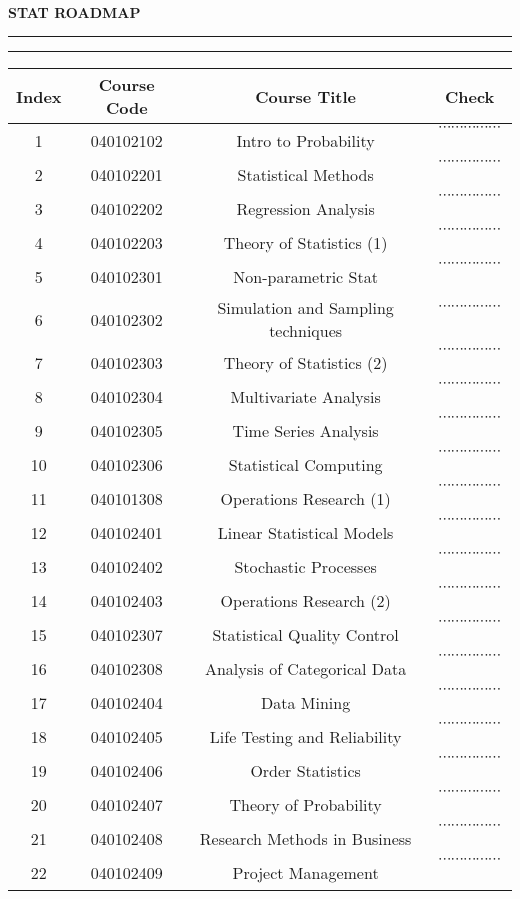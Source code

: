 \documentclass[12pt]{article}
\author{}
\date{Tuesday, July 5 --- 2022}
\renewcommand{\maketitle}{
\huge\bfseries\centering
STAT ROADMAP
\vspace{1em}
\hrule
\vspace{2pt}
\hrule
}
\newcommand{\cd}{\(\cdots\cdots\cdots\cdots\cdots\)}
\begin{document}
\doublespacing\
\maketitle
\vspace{1em}

\begin{table}[h]
    \centering
    \begin{tabular}{c|c|c|c} %
  \textbf{Index} & \textbf{Course Code} & \textbf{Course Title} & \textbf{Check} \\
  \hline\hline %
        1 & 040102102 & Intro to Probability & \cd\ \\
        2 & 040102201 & Statistical Methods & \cd\ \\
        3 & 040102202 & Regression Analysis & \cd\ \\
        4 & 040102203 & Theory of Statistics (1) & \cd\ \\
        5 & 040102301 & Non-parametric Stat & \cd\ \\
        6 & 040102302 & Simulation and Sampling techniques & \cd\ \\
        7 & 040102303 & Theory of Statistics (2) & \cd\ \\
        8 & 040102304 & Multivariate Analysis & \cd\ \\
        9 & 040102305 & Time Series Analysis & \cd\ \\
        10 & 040102306 & Statistical Computing & \cd\ \\
        11 & 040101308 & Operations Research (1) & \cd\ \\
        12 & 040102401 & Linear Statistical Models & \cd\ \\
        13 & 040102402 & Stochastic Processes & \cd\ \\
        14 & 040102403 & Operations Research (2) & \cd\ \\
\hline %
        15 & 040102307 & Statistical Quality Control & \cd\ \\
        16 & 040102308 & Analysis of Categorical Data & \cd\ \\ 
        17 & 040102404 & Data Mining & \cd\ \\ 
        18 & 040102405 & Life Testing and Reliability & \cd\ \\
        19 & 040102406 & Order Statistics & \cd\ \\
        20 & 040102407 & Theory of Probability & \cd\ \\
        21 & 040102408 & Research Methods in Business & \cd\ \\
        22 & 040102409 & Project Management & \cd\ \\
        
        
    \end{tabular}
\end{table}
\end{document}
